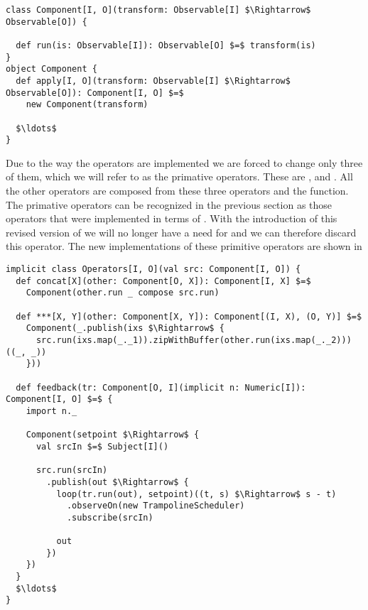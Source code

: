 \hspace*{-\parindent}
\begin{minipage}{\linewidth}
\begin{lstlisting}[style=ScalaStyle, caption={Revised version of the \comp interface}, label={lst:component-v2}]
class Component[I, O](transform: Observable[I] $\Rightarrow$ Observable[O]) {

  def run(is: Observable[I]): Observable[O] $=$ transform(is)
}
object Component {
  def apply[I, O](transform: Observable[I] $\Rightarrow$ Observable[O]): Component[I, O] $=$
    new Component(transform)

  $\ldots$
}
\end{lstlisting}
\end{minipage}

Due to the way the operators are implemented we are forced to change only three of them, which we will refer to as the primative operators. These are , \code{(***)} and . All the other operators are composed from these three operators and the  function. The primative operators can be recognized in the previous section as those operators that were implemented in terms of . With the introduction of this revised version of \comp we will no longer have a need for  and we can therefore discard this operator.  The new implementations of these primitive operators are shown in 

\hspace*{-\parindent}
\begin{minipage}{\linewidth}
\begin{lstlisting}[style=ScalaStyle, caption={Revised implementations of the primitive operators}, label={lst:primative-operator-revisions}]
implicit class Operators[I, O](val src: Component[I, O]) {
  def concat[X](other: Component[O, X]): Component[I, X] $=$
    Component(other.run _ compose src.run)
  
  def ***[X, Y](other: Component[X, Y]): Component[(I, X), (O, Y)] $=$
    Component(_.publish(ixs $\Rightarrow$ {
      src.run(ixs.map(_._1)).zipWithBuffer(other.run(ixs.map(_._2)))((_, _))
    }))
  
  def feedback(tr: Component[O, I](implicit n: Numeric[I]): Component[I, O] $=$ {
    import n._
    
    Component(setpoint $\Rightarrow$ {
      val srcIn $=$ Subject[I]()
      
      src.run(srcIn)
        .publish(out $\Rightarrow$ {
          loop(tr.run(out), setpoint)((t, s) $\Rightarrow$ s - t)
            .observeOn(new TrampolineScheduler)
            .subscribe(srcIn)

          out
        })
    })
  }
  $\ldots$
}
\end{lstlisting}
\end{minipage}

